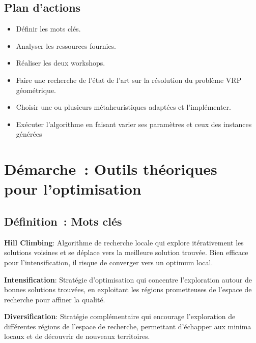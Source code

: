 \subsection*{Plan d'actions}
{}
\begin{itemize}
	\item Définir les mots clés.
	\item Analyser les ressources fournies.
	\item Réaliser les deux workshops.
	\item Faire une recherche de l'état de l'art sur la résolution du problème VRP géométrique.
	\item Choisir une ou plusieurs métaheuristiques adaptées et l'implémenter.
	\item Exécuter l'algorithme en faisant varier ses paramètres et ceux des instances générées
\end{itemize}

\newpage
\section*{Démarche~: Outils théoriques \\ pour l'optimisation}

\subsection*{Définition~: Mots clés}
{}
\noindent \textbf{Hill Climbing}: Algorithme de recherche locale qui explore itérativement les solutions voisines et se déplace vers la meilleure solution trouvée. Bien efficace pour l'intensification, il risque de converger vers un optimum local.

\vspace{0.5cm}

\noindent \textbf{Intensification}: Stratégie d'optimisation qui concentre l'exploration autour de bonnes solutions trouvées, en exploitant les régions prometteuses de l'espace de recherche pour affiner la qualité.

\vspace{0.5cm}

\noindent \textbf{Diversification}: Stratégie complémentaire qui encourage l'exploration de différentes régions de l'espace de recherche, permettant d'échapper aux minima locaux et de découvrir de nouveaux territoires.

